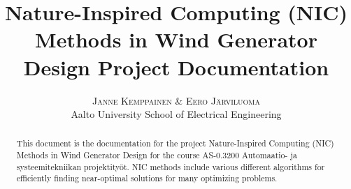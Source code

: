 \documentclass[twoside]{article}
\title{\vspace{-15mm}\fontsize{24pt}{10pt}\selectfont\textbf{Nature-Inspired Computing (NIC) Methods in Wind Generator Design Project Documentation}} %
\author{
\large
\textsc{Janne Kemppainen \& Eero J\"arviluoma}\\[2mm] %
\normalsize Aalto University School of Electrical Engineering \\ %
\vspace{-5mm}
}
\date{}
\begin{document}
\maketitle %

\thispagestyle{fancy} %


\begin{abstract}

\noindent This document is the documentation for the project Nature-Inspired Computing (NIC) Methods in Wind Generator Design for the course AS-0.3200 Automaatio- ja systeemitekniikan projektity\"ot. NIC methods include various different algorithms for efficiently finding near-optimal solutions for many optimizing problems.

\end{abstract}

\end{document}
